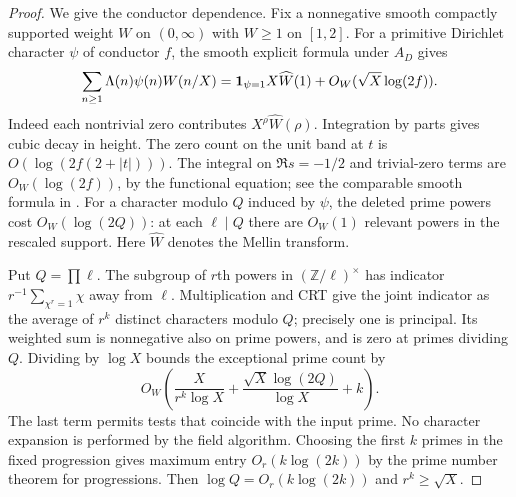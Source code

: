 \documentclass[11pt]{article}
\begin{document}
\begin{proof}
We give the conductor dependence. Fix a nonnegative smooth compactly supported
weight $W$ on $(0,\infty)$ with $W\ge1$ on $[1,2]$. For a primitive Dirichlet character $\psi$ of conductor $f$, the smooth explicit formula under $A_D$ gives
\[
 \sum_{n\ge1}\Lambda(n)\psi(n)W(n/X)
 ={\bf1}_{\psi=1}X\widehat W(1)+O_W(\sqrt X\log(2f)).
\]
Indeed each nontrivial zero contributes $X^\rho\widehat W(\rho)$.
Integration by parts gives cubic decay in height. The zero count on the unit band at $t$ is $O(\log(2f(2+|t|)))$. The integral on $\Re s=-1/2$ and trivial-zero terms are $O_W(\log(2f))$, by the functional equation; see the comparable smooth formula in \cite[Lemma 11.2]{PF}.
For a character modulo $Q$ induced by $\psi$, the deleted prime powers cost
$O_W(\log(2Q))$: at each $\ell\mid Q$ there are $O_W(1)$ relevant powers in the rescaled support. Here $\widehat W$ denotes the Mellin transform.

Put $Q=\prod\ell$. The subgroup of $r$th powers in $(\mathbb Z/\ell)^\times$
has indicator $r^{-1}\sum_{\chi^r=1}\chi$ away from $\ell$. Multiplication and CRT give the joint
indicator as the average of $r^k$ distinct characters modulo $Q$; precisely one
is principal. Its weighted sum is nonnegative also on prime powers, and is zero
at primes dividing $Q$. Dividing by $\log X$ bounds the exceptional prime count by
\begin{equation}\label{raw}
 O_W\left(\frac{X}{r^k\log X}
       +\frac{\sqrt X\log(2Q)}{\log X}+k\right).
\end{equation}
The last term permits tests that coincide with the input prime. No character
expansion is performed by the field algorithm. Choosing the first $k$ primes in
the fixed progression gives maximum entry $O_r(k\log(2k))$ by the prime number
theorem for progressions. Then $\log Q=O_r(k\log(2k))$ and $r^k\ge\sqrt X$.
\end{proof}
\end{document}
